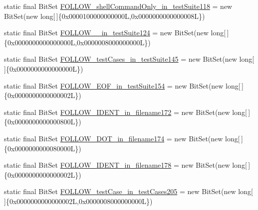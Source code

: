 \begin{DoxyCompactItemize}
\item 
static final Bit\-Set \hyperlink{classorg_1_1tzi_1_1use_1_1parser_1_1testsuite_1_1_test_suite_parser_a343fd2f14c5fd43c09fc2158a63754ed}{F\-O\-L\-L\-O\-W\-\_\-shell\-Command\-Only\-\_\-in\-\_\-test\-Suite118} = new Bit\-Set(new long\mbox{[}$\,$\mbox{]}\{0x0000100000000000\-L,0x0000000000000008\-L\})
\item 
static final Bit\-Set \hyperlink{classorg_1_1tzi_1_1use_1_1parser_1_1testsuite_1_1_test_suite_parser_aec64618c053d15ac1a6d177f823b3f94}{F\-O\-L\-L\-O\-W\-\_\-\_\-in\-\_\-test\-Suite124} = new Bit\-Set(new long\mbox{[}$\,$\mbox{]}\{0x0000000000000000\-L,0x0000008000000000\-L\})
\item 
static final Bit\-Set \hyperlink{classorg_1_1tzi_1_1use_1_1parser_1_1testsuite_1_1_test_suite_parser_acab506a9a62dd4d9c71873797d34849f}{F\-O\-L\-L\-O\-W\-\_\-test\-Cases\-\_\-in\-\_\-test\-Suite145} = new Bit\-Set(new long\mbox{[}$\,$\mbox{]}\{0x0000000000000000\-L\})
\item 
static final Bit\-Set \hyperlink{classorg_1_1tzi_1_1use_1_1parser_1_1testsuite_1_1_test_suite_parser_a7c8c8572fea9b8cee110664222113205}{F\-O\-L\-L\-O\-W\-\_\-\-E\-O\-F\-\_\-in\-\_\-test\-Suite154} = new Bit\-Set(new long\mbox{[}$\,$\mbox{]}\{0x0000000000000002\-L\})
\item 
static final Bit\-Set \hyperlink{classorg_1_1tzi_1_1use_1_1parser_1_1testsuite_1_1_test_suite_parser_a921923a0706706925936bdd3d8646c93}{F\-O\-L\-L\-O\-W\-\_\-\-I\-D\-E\-N\-T\-\_\-in\-\_\-filename172} = new Bit\-Set(new long\mbox{[}$\,$\mbox{]}\{0x0000000000000800\-L\})
\item 
static final Bit\-Set \hyperlink{classorg_1_1tzi_1_1use_1_1parser_1_1testsuite_1_1_test_suite_parser_a07a48686e35df400b31abb750f9cebec}{F\-O\-L\-L\-O\-W\-\_\-\-D\-O\-T\-\_\-in\-\_\-filename174} = new Bit\-Set(new long\mbox{[}$\,$\mbox{]}\{0x0000000000080000\-L\})
\item 
static final Bit\-Set \hyperlink{classorg_1_1tzi_1_1use_1_1parser_1_1testsuite_1_1_test_suite_parser_a1f1ce98211446db63568a2626d02f014}{F\-O\-L\-L\-O\-W\-\_\-\-I\-D\-E\-N\-T\-\_\-in\-\_\-filename178} = new Bit\-Set(new long\mbox{[}$\,$\mbox{]}\{0x0000000000000002\-L\})
\item 
static final Bit\-Set \hyperlink{classorg_1_1tzi_1_1use_1_1parser_1_1testsuite_1_1_test_suite_parser_ae3506cc1d0d641c75bf72f22acd4f1f5}{F\-O\-L\-L\-O\-W\-\_\-test\-Case\-\_\-in\-\_\-test\-Cases205} = new Bit\-Set(new long\mbox{[}$\,$\mbox{]}\{0x0000000000000002\-L,0x0000008000000000\-L\})
\item 

\end{DoxyCompactItemize}
